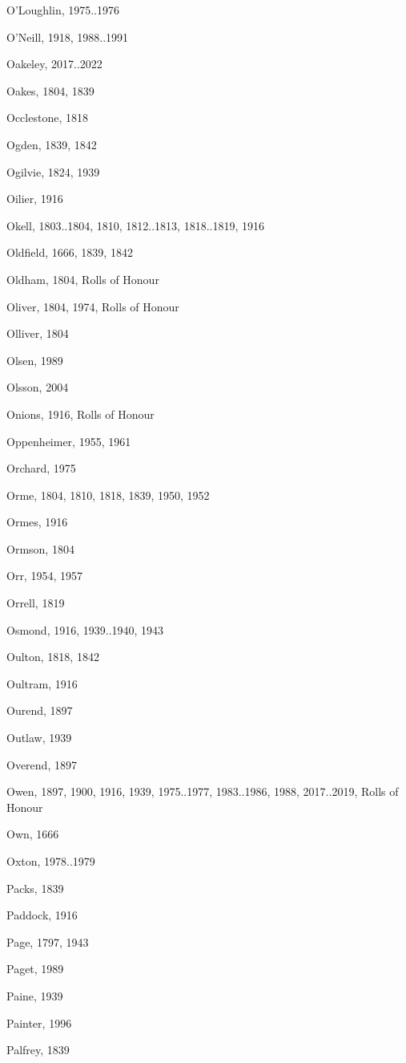 {\begin{theindex}
\item O'Loughlin, 1975..1976
\item O'Neill, 1918, 1988..1991
\item Oakeley, 2017..2022
\item Oakes, 1804, 1839
\item Occlestone, 1818
\item Ogden, 1839, 1842
\item Ogilvie, 1824, 1939
\item Oilier, 1916
\item Okell, 1803..1804, 1810, 1812..1813, 1818..1819, 1916
\item Oldfield, 1666, 1839, 1842
\item Oldham, 1804, Rolls of Honour
\item Oliver, 1804, 1974, Rolls of Honour
\item Olliver, 1804
\item Olsen, 1989
\item Olsson, 2004
\item Onions, 1916, Rolls of Honour
\item Oppenheimer, 1955, 1961
\item Orchard, 1975
\item Orme, 1804, 1810, 1818, 1839, 1950, 1952
\item Ormes, 1916
\item Ormson, 1804
\item Orr, 1954, 1957
\item Orrell, 1819
\item Osmond, 1916, 1939..1940, 1943
\item Oulton, 1818, 1842
\item Oultram, 1916
\item Ourend, 1897
\item Outlaw, 1939
\item Overend, 1897
\item Owen, 1897, 1900, 1916, 1939, 1975..1977, 1983..1986, 1988, 2017..2019, Rolls of Honour
\item Own, 1666
\item Oxton, 1978..1979
\item Packs, 1839
\item Paddock, 1916
\item Page, 1797, 1943
\item Paget, 1989
\item Paine, 1939
\item Painter, 1996
\item Palfrey, 1839

\end{theindex}}
